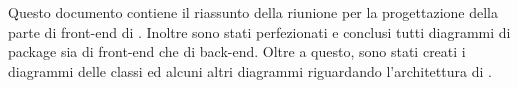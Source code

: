 Questo documento contiene il riassunto della riunione per la progettazione della parte di front-end di \progetto. Inoltre sono stati perfezionati e conclusi tutti diagrammi di package sia di front-end che di back-end. Oltre a questo, sono stati creati i diagrammi delle classi ed alcuni altri diagrammi riguardando l'architettura di \progetto.